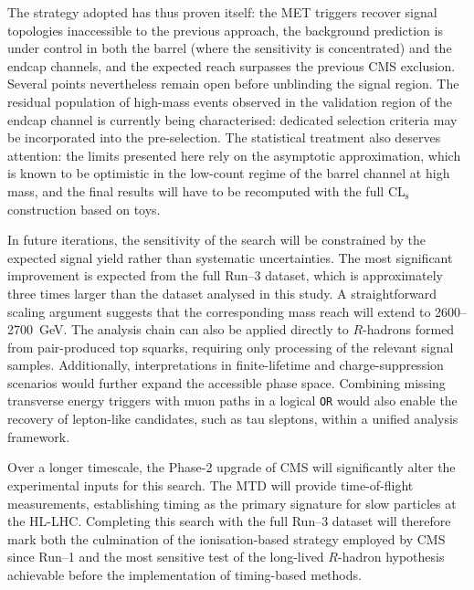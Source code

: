\vspace{0.5 cm}

The strategy adopted has thus proven itself: the MET triggers recover signal topologies inaccessible to the previous approach, the background prediction is under control in both the barrel (where the sensitivity is concentrated) and the endcap channels, and the expected reach surpasses the previous CMS exclusion. Several points nevertheless remain open before unblinding the signal region. The residual population of high-mass events observed in the validation region of the endcap channel is currently being characterised: dedicated selection criteria may be incorporated into the pre-selection. The statistical treatment also deserves attention: the limits presented here rely on the asymptotic approximation, which is known to be optimistic in the low-count regime of the barrel channel at high mass, and the final results will have to be recomputed with the full CL$_\text{s}$ construction based on toys.

\vspace{0.5 cm}

In future iterations, the sensitivity of the search will be constrained by the expected signal yield rather than systematic uncertainties. The most significant improvement is expected from the full Run--3 dataset, which is approximately three times larger than the dataset analysed in this study. A straightforward scaling argument suggests that the corresponding mass reach will extend to 2600--2700~GeV. The analysis chain can also be applied directly to $R$-hadrons formed from pair-produced top squarks, requiring only processing of the relevant signal samples. Additionally, interpretations in finite-lifetime and charge-suppression scenarios would further expand the accessible phase space. Combining missing transverse energy triggers with muon paths in a logical \texttt{OR} would also enable the recovery of lepton-like candidates, such as tau sleptons, within a unified analysis framework.

Over a longer timescale, the Phase-2 upgrade of CMS will significantly alter the experimental inputs for this search. The MTD will provide time-of-flight measurements, establishing timing as the primary signature for slow particles at the HL-LHC. Completing this search with the full Run--3 dataset will therefore mark both the culmination of the ionisation-based strategy employed by CMS since Run--1 and the most sensitive test of the long-lived $R$-hadron hypothesis achievable before the implementation of timing-based methods.
